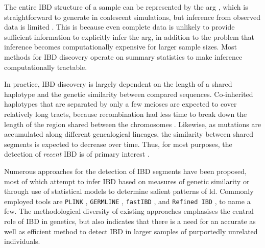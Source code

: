 The entire IBD structure of a sample can be represented by the \gls{arg} \citep{Griffiths:1991jp,Griffiths:1996dx,griffiths1997}, which is straightforward to generate in coalescent simulations, but inference from observed data is limited \citep{Rasmussen:2014cq}.
This is because even complete data is unlikely to provide sufficient information to explicitly infer the \gls{arg}, in addition to the problem that inference becomes computationally expensive for larger sample sizes.
Most methods for IBD discovery operate on summary statistics to make inference computationally tractable.

In practice, IBD discovery is largely dependent on the length of a shared haplotype and the genetic similarity between compared sequences.
Co-inherited haplotypes that are separated by only a few meioses are expected to cover relatively long tracts, because recombination had less time to break down the length of the region shared between the  chromosomes \citep{Thompson:2008cub,Thompson:2013cj}.
Likewise, as mutations are accumulated along different genealogical lineages, the similarity between shared segments is expected to decrease over time.
Thus, for most purposes, the detection of \emph{recent} IBD is of primary interest \citep{Browning:2010dz}.

Numerous approaches for the detection of IBD segments have been proposed, most of which attempt to infer IBD based on measures of genetic similarity or through use of statistical models to determine salient patterns of \gls{ld}.
Commonly employed tools are
\texttt{PLINK} \citep{Purcell:2007dg},
\texttt{GERMLINE} \citep{Gusev:2009hd},
\texttt{fastIBD} \citep{Browning:2011do}, and
\texttt{Refined\,IBD} \citep{Browning:2013eh}, to name a few.
The methodological diversity of existing approaches emphasises the central role of IBD in genetics, but also indicates that there is a need for an accurate as well as efficient method to detect IBD in larger samples of purportedly unrelated individuals.

